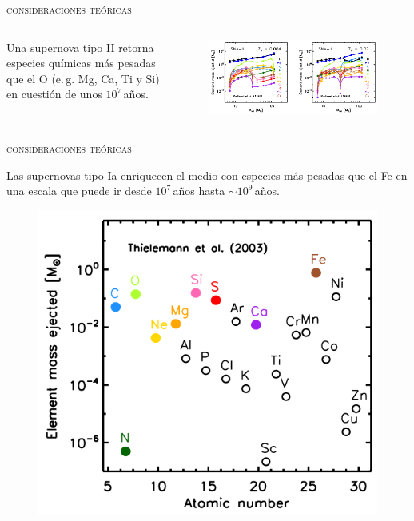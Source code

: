 \documentclass[xcolor=dvipsnames,4pt,hyperref={colorlinks,citecolor=black,linkcolor=black,urlcolor=black}]{beamer}
\begin{document}
\begin{frame}\textsc{consideraciones teóricas}

\begin{columns}
Una supernova tipo II retorna especies químicas más pesadas que el O (e.\,g. Mg, Ca, Ti y Si) en
cuestión de unos $10^7\,$años.
\begin{figure}
\includegraphics[scale=1]{img/yates2013-4}
\end{figure}
\end{columns}
\end{frame}

\begin{frame}{\textsc{consideraciones teóricas}}

Las supernovas tipo Ia enriquecen el medio con especies más pesadas que el Fe en una escala que
puede ir desde $10^7\,$años hasta $\sim10^9\,$años.
\begin{figure}
\includegraphics[scale=1]{img/yates2013-3}
\end{figure}
\end{frame}
\end{document}
